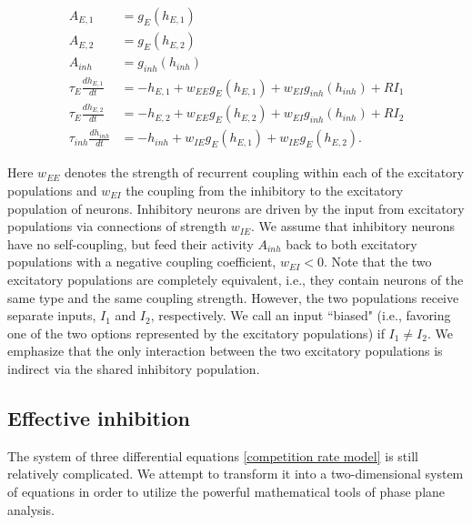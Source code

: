 \documentclass[12pt,hyperref,a4paper,UTF8]{ctexart}
\begin{document}
\begin{equation}
    \begin{aligned}
        A_{E,1}&=g_E (h_{E,1})\\
        A_{E,2}&=g_E (h_{E,2})\\
        A_{inh}&=g_{inh} (h_{inh})\\
        \tau_E \frac{dh_{E,1}}{dt}&=-h_{E,1}+w_{EE}g_E (h_{E,1})+w_{EI}g_{inh} (h_{inh})+RI_1\\
        \tau_E \frac{dh_{E,2}}{dt}&=-h_{E,2}+w_{EE}g_E (h_{E,2})+w_{EI}g_{inh} (h_{inh})+RI_2\\
        \tau_{inh} \frac{dh_{inh}}{dt}&=-h_{inh}+w_{IE}g_E (h_{E,1})+w_{IE}g_{E} (h_{E,2}).
    \end{aligned}
\end{equation}\label{competition rate model}

\noindent
Here $w_{EE}$ denotes the strength of recurrent coupling within each of the excitatory populations and $w_{EI}$ the coupling from the inhibitory to the excitatory population of neurons. Inhibitory neurons are driven by the input from excitatory populations via connections of strength $w_{IE}$. We assume that inhibitory neurons have no self-coupling, but feed their activity $A_{inh}$ back to both excitatory populations with a negative coupling coefficient, $w_{EI} < 0$. Note that the two excitatory populations are completely equivalent, i.e., they contain neurons of the same type and the same coupling strength. However, the two populations receive separate inputs, $I_1$ and $I_2$, respectively. We call an input ``biased" (i.e., favoring one of the two options represented by the excitatory populations) if $I_1 \neq I_2$. We emphasize that the only interaction between the two excitatory populations is indirect via the shared inhibitory population.

\subsection{Effective inhibition}

The system of three differential equations \autoref{competition rate model} is still relatively complicated. We attempt to transform it into a two-dimensional system of equations in order to utilize the powerful mathematical tools of phase plane analysis.
\end{document}
